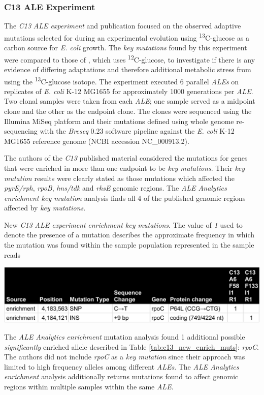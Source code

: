 \documentclass[12pt,final,masters,chapterheads]{ucsd}  %
\begin{document}
\subsubsection{C13 ALE Experiment}
The \textit{C13} \textit{ALE experiment} and publication focused on the observed adaptive mutations selected for during an experimental evolution using \textsuperscript{13}C-glucose as a carbon source for \textit{E. coli} growth. The \textit{key mutations} found by this experiment were compared to those of \cite{pmid25304508}, which uses \textsuperscript{12}C-glucose, to investigate if there is any evidence of differing adaptations and therefore additional metabolic stress from using the \textsuperscript{13}C-glucose isotope. The experiment executed 6 parallel \textit{ALEs}  on replicates of \textit{E. coli} K-12 MG1655 for approximately 1000 generations per \textit{ALE}. Two clonal samples were taken from each \textit{ALE}; one sample served as a midpoint clone and the other as the endpoint clone. The clones were sequenced using the Illumina MiSeq platform and their mutations defined using whole genome re-sequencing with the \textit{Breseq} 0.23 software pipeline against the \textit{E. coli} K-12 MG1655 reference genome (NCBI accession NC\_000913.2).

The authors of the \textit{C13} published material considered the mutations for genes that were enriched in more than one endpoint to be \textit{key mutations}. Their \textit{key mutation} results were clearly stated as those mutations which affected the \textit{pyrE/rph}, \textit{rpoB}, \textit{hns/tdk} and \textit{rhsE} genomic regions. The\textit{ ALE Analytics} \textit{enrichment key mutation} analysis finds all 4 of the published genomic regions affected by \textit{key mutations}.
\begin{table}[H]
  \caption{New \textit{C13} \textit{ALE experiment} \textit{enrichment key mutations}. The value of \textit{1} used to denote the presence of a mutation describes the approximate frequency in which the mutation was found within the sample population represented in the sample reads \cite{breseq_paper}}
  \centering
  \includegraphics[width=\textwidth]{c13_new_enrich_muts.png}
  \label{tab:c13_new_enrich_muts}
\end{table}
The \textit{ALE Analytics} \textit{enrichment} mutation analysis found 1 additional possible \textit{significantly} enriched allele described in Table \ref{tab:c13_new_enrich_muts}: \textit{rpoC}. The authors did not include \textit{rpoC} as a \textit{key mutation} since their approach was limited to high frequency alleles among different \textit{ALEs}. The \textit{ALE Analytics} \textit{enrichment} analysis additionally returns mutations found to affect genomic regions within multiple samples within the same \textit{ALE}.
\end{document}
